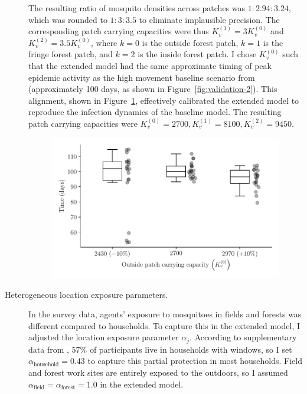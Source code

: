 \begin{description}
    The resulting ratio of mosquito densities across patches was $1 : 2.94 : 3.24$, which was rounded to $1 : 3 : 3.5$ to eliminate implausible precision. The corresponding patch carrying capacities were thus $K_v^{(1)}=3K_v^{(0)}$ and $K_v^{(2)}=3.5K_v^{(0)}$, where $k=0$ is the outside forest patch, $k=1$ is the fringe forest patch, and $k=2$ is the inside forest patch. I chose $K_v^{(0)}$ such that the extended model had the same approximate timing of peak epidemic activity as the high movement baseline scenario from \citet{manore_network-patch_2015} (approximately 100 days, as shown in Figure~\ref{fig:validation-2}). This alignment, shown in Figure~\ref{fig:k_v_candidates}, effectively calibrated the extended model to reproduce the infection dynamics of the baseline model. The resulting patch carrying capacities were $K_v^{(0)} = 2700, K_v^{(1)}= 8100, K_v^{(2)}=9450$.

    \begin{figure}[hbt!]
         \centering
         \includegraphics[width=\textwidth]{figures/ch4/k_v_candidates.pdf}
         \vspace{-1cm}
        \label{fig:k_v_candidates}
    \end{figure}
    
    \item[Heterogeneous location exposure parameters.] In the survey data, agents' exposure to mosquitoes in fields and forests was different compared to households. To capture this in the extended model, I adjusted the location exposure parameter $\alpha_j$. According to supplementary data from \citet{sandfort_forest_2020}, 57\% of participants live in households with windows, so I set $\alpha_{\text{household}}=0.43$ to capture this partial protection in most households. Field and forest work sites are entirely exposed to the outdoors, so I assumed $\alpha_{\text{field}}=\alpha_{\text{forest}}=1.0$ in the extended model.
\end{description}

